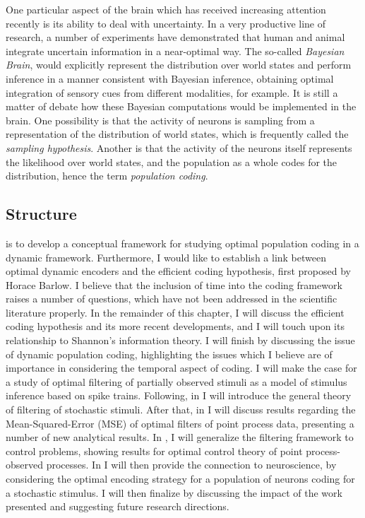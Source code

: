 One particular aspect of the brain which has received increasing attention recently is its ability to deal with uncertainty. In a very productive line of research, a number of experiments have demonstrated that human and animal integrate uncertain information in a near-optimal way. The so-called {\em Bayesian Brain}\cite{Knill2004}, would explicitly represent the distribution over world states and perform inference in a manner consistent with Bayesian inference, obtaining optimal integration of sensory cues from different modalities, for example. It is still a matter of debate how these Bayesian computations would be implemented in the brain. One possibility is that the activity of neurons is sampling from a representation of the distribution of world states\cite{Berkes2011}, which is frequently called the {\em sampling hypothesis}. Another is that the activity of the neurons itself represents the likelihood over world states\cite{Ma2006}, and the population as a whole codes for the distribution, hence the term {\em population coding}.\par

\subsection*{Structure}
 is to develop a conceptual framework for studying optimal population coding in a dynamic framework. Furthermore, I would like to establish a link between optimal dynamic encoders and the efficient coding hypothesis, first proposed by Horace Barlow\cite{Barlow1961}. I believe that the inclusion of time into the coding framework raises a number of questions, which have not been addressed in the scientific literature properly. In the remainder of this chapter, I will discuss the efficient coding hypothesis and its more recent developments, and I will touch upon its relationship to Shannon's information theory\cite{Shannon1948}. I will finish by discussing the issue of dynamic population coding, highlighting the issues which I believe are of importance in considering the temporal aspect of coding. I will make the case for a study of optimal filtering of partially observed stimuli as a model of stimulus inference based on spike trains. Following, in   I will introduce the general theory of filtering of stochastic stimuli. After that, in  I will discuss results regarding the Mean-Squared-Error (MSE) of optimal filters of point process data, presenting a number of new analytical results. In , I will generalize the filtering framework to control problems, showing results for optimal control theory of point process-observed processes. In  I will then provide the connection to neuroscience, by considering the optimal encoding strategy for a population of neurons coding for a stochastic stimulus. I will then finalize by discussing the impact of the work presented and suggesting future research directions.\par

